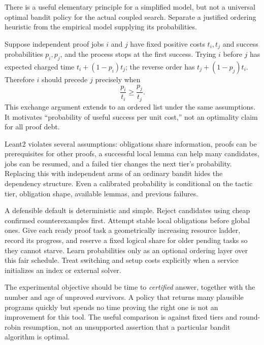 \ans There is a useful elementary principle for a simplified model, but not a universal optimal bandit policy for the actual coupled search. Separate a justified ordering heuristic from the empirical model supplying its probabilities.

Suppose independent proof jobs $i$ and $j$ have fixed positive costs $t_i,t_j$ and success probabilities $p_i,p_j$, and the process stops at the first success. Trying $i$ before $j$ has expected charged time $t_i+(1-p_i)t_j$; the reverse order has $t_j+(1-p_j)t_i$. Therefore $i$ should precede $j$ precisely when
\[
  \frac{p_i}{t_i}\geq\frac{p_j}{t_j}.
\]
This exchange argument extends to an ordered list under the same assumptions. It motivates ``probability of useful success per unit cost,'' not an optimality claim for all proof debt.

Leant2 violates several assumptions: obligations share information, proofs can be prerequisites for other proofs, a successful local lemma can help many candidates, jobs can be resumed, and a failed tier changes the next tier's probability. Replacing this with independent arms of an ordinary bandit hides the dependency structure. Even a calibrated probability is conditional on the tactic tier, obligation shape, available lemmas, and previous failures.

A defensible default is deterministic and simple. Reject candidates using cheap confirmed counterexamples first. Attempt stable local obligations before global ones. Give each ready proof task a geometrically increasing resource ladder, record its progress, and reserve a fixed logical share for older pending tasks so they cannot starve. Learn probabilities only as an optional ordering layer over this fair schedule. Treat switching and setup costs explicitly when a service initializes an index or external solver.

The experimental objective should be time to \emph{certified} answer, together with the number and age of unproved survivors. A policy that returns many plausible programs quickly but spends no time proving the right one is not an improvement for this tool. The useful comparison is against fixed tiers and round-robin resumption, not an unsupported assertion that a particular bandit algorithm is optimal.
